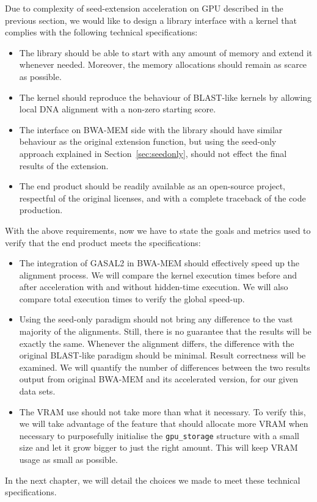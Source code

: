 Due to complexity of seed-extension acceleration on GPU described in the previous section, we would like to design a library interface with a kernel that complies with the following technical specifications:

\begin{itemize}
	\item The library should be able to start with any amount of memory and extend it whenever needed. Moreover, the memory allocations should remain as scarce as possible.
	\item The kernel should reproduce the behaviour of BLAST-like kernels by allowing local DNA alignment with a non-zero starting score.
	\item The interface on BWA-MEM side with the library should have similar behaviour as the original extension function, but using the seed-only approach explained in Section~\ref{sec:seedonly}, should not effect the final results of the extension.
	\item The end product should be readily available as an open-source project, respectful of the original licenses, and with a complete traceback of the code production.
\end{itemize}

With the above requirements, now we have to state the goals and metrics used to verify that the end product meets the specifications:
\begin{itemize}
	\item The integration of GASAL2 in BWA-MEM should effectively speed up the alignment process. We will compare the kernel execution times before and after acceleration  with and without hidden-time execution. We will also compare total execution times to verify the global speed-up.
	
	\item Using the seed-only paradigm should not bring any difference to the vast majority of the alignments. Still, there is no guarantee that the results will be exactly the same. Whenever the alignment differs, the difference with the original BLAST-like paradigm should be minimal. Result correctness will be examined. We will quantify the number of differences between the two results output from original BWA-MEM and its accelerated version, for our given data sets.
	
	\item The VRAM use should not take more than what it necessary. To verify this, we will take advantage of the feature that should allocate more VRAM when necessary to purposefully initialise the \verb|gpu_storage| structure with a small size and let it grow bigger to just the right amount. This will keep VRAM usage as small as possible.
	
\end{itemize}

In the next chapter, we will detail the choices we made to meet these technical specifications.